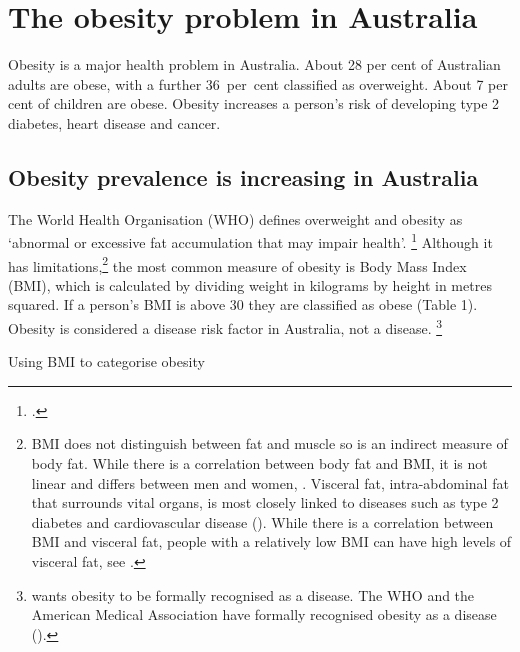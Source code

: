\documentclass[embargoed]{grattan}
\begin{document}
\contentspage

\listoffigures

\chapter{The obesity problem in Australia}\label{the-obesity-problem-in-australia}

Obesity is a major health problem in Australia.
About 28 per cent of Australian adults are obese, with a further 36~per~cent classified as overweight.
About 7 per cent of children are obese.
Obesity increases a person's risk of developing type 2 diabetes, heart disease and cancer.

\section{Obesity prevalence is increasing in Australia }\label{obesity-prevalence-is-increasing-in-australia}

The World Health Organisation (WHO) defines overweight and obesity as `abnormal or excessive fat accumulation that may impair health'.%
\footcite{Organization2016ObesityoverweightFact} Although it has limitations,\footnote{BMI does not distinguish between fat and muscle so is an indirect measure of body fat.
While there is a correlation between body fat and BMI, it is not linear and differs between men and women, \textcite{Rothman2008BMIrelatederrors}.
Visceral fat, intra-abdominal fat that surrounds vital organs, is most closely linked to diseases such as type 2 diabetes and cardiovascular disease (\textcites{Mathieu2009Visceralobesitylink}{Despres2012Bodyfatdistribution}{Janiszewski2012WhyBodyMass}).
While there is a correlation between BMI and visceral fat, people with a relatively low BMI can have high levels of visceral fat, see \textcite{Rankinen1999predictionabdominalvisceral}.} 
the most common measure of obesity is Body Mass Index (BMI), which is calculated by dividing weight in kilograms by height in metres squared.
If a person's BMI is above 30 they are classified as obese (Table 1).
Obesity is considered a disease risk factor in Australia, not a disease.%
\footnote{\textcite{Australia2014NoTimeWeight} wants obesity to be formally recognised as a disease.
The WHO and the American Medical Association have formally recognised obesity as a disease (\textcites{Organisation2000Obesitypreventingmanaging}{Stoner2014DidAmericanMedical}{Australia2015NoTimeWeight}).}

\begin{table}
\caption{Using BMI to categorise obesity}



\end{table}
\end{document}
